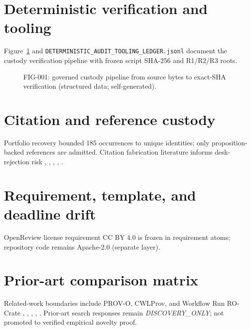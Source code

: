 \section{Deterministic verification and tooling}
\label{app:tooling}
Figure~\ref{fig:custody-pipeline} and \texttt{DETERMINISTIC\_AUDIT\_TOOLING\_LEDGER.jsonl} document the custody verification pipeline with frozen script SHA-256 and R1/R2/R3 roots.

\begin{figure}[ht]
  \centering
  \caption{FIG-001: governed custody pipeline from source bytes to exact-SHA verification (structured data; self-generated).}
  \label{fig:custody-pipeline}
\end{figure}

\section{Citation and reference custody}
\label{app:citations}
Portfolio recovery bounded 185 occurrences to unique identities; only proposition-backed references are admitted. Citation fabrication literature informs desk-rejection risk \cite{kuhn2014trusty}, \cite{walters2023fabrication}, \cite{khan2019cwlprov}, \cite{leo2024rocrote}, \cite{lebo2013provo}.

\section{Requirement, template, and deadline drift}
\label{app:requirements}
OpenReview license requirement CC BY 4.0 is frozen in requirement atoms; repository code remains Apache-2.0 (separate layer).

\section{Prior-art comparison matrix}
\label{app:priorart}
Related-work boundaries include PROV-O, CWLProv, and Workflow Run RO-Crate \cite{kuhn2014trusty}, \cite{walters2023fabrication}, \cite{khan2019cwlprov}, \cite{leo2024rocrote}, \cite{lebo2013provo}. Prior-art search responses remain \emph{DISCOVERY\_ONLY}; not promoted to verified empirical novelty proof.

